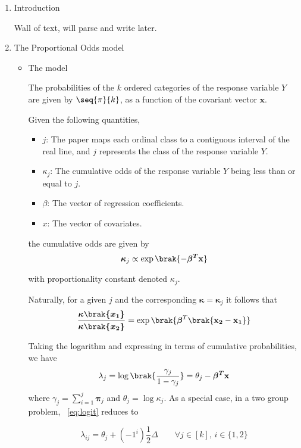 \documentclass{amsart}
\begin{document}
    \begin{enumerate}[label=\textbf{(\Roman*)}]
        \item Introduction

    Wall of text, will parse and write later.

    \item The Proportional Odds model
        \begin{itemize}
            \item The model
            
            The probabilities of the \(k\) ordered categories of the response variable \(Y\) are given by \(\seq{\pi}{k}\), as a function of the covariant vector \(\mathbf{x}\).

        Given the following quantities,
        \begin{itemize}
            \item \(j\): The paper maps each ordinal class to a contiguous interval of the real line, and \(j\) represents the class of the response variable \(Y\).
            \item \(\kappa_j\): The cumulative odds of the response variable \(Y\) being less than or equal to \(j\).
            \item \(\beta\): The vector of regression coefficients.
            \item \(x\): The vector of covariates.
        \end{itemize}

        the cumulative odds are given by
        \[\boldsymbol{\kappa}_j \propto \exp \brak{- \boldsymbol{\beta^T} \mathbf{x}}\]

        with proportionality constant denoted \(\kappa_j\).

        Naturally, for a given \(j\) and the corresponding \(\boldsymbol{\kappa} = \boldsymbol{\kappa}_j\) it follows that 
        \[
            \boldsymbol{\frac{\kappa\brak{x_1}}{\kappa\brak{x_2}}} = \exp \brak{\boldsymbol{\beta}^T \brak{\mathbf{x_2 - x_1}}}
        \]

        Taking the logarithm and expressing in terms of cumulative probabilities, we have
        \[
            \lambda_j = \log\brak{\frac{\gamma_j}{1 - \gamma_j}} = \theta_j - \boldsymbol{\beta^T} \mathbf{x} \label{eq:logit}
        \] where \( \displaystyle \gamma_j = \sum_{i = 1}^{j} \mathbf{\pi}_j\) and \(\theta_j = \log \kappa_j\). 
        As a special case, in a two group problem, ~\ref{eq:logit} reduces to 
        
        \[\lambda_{ij} = \theta_j + (-1^i) \frac{1}{2} \Delta \qquad \forall j \in [k],\, i \in \{1, 2\} \label{eq:delta}\]
    

\end{itemize}
\end{enumerate}
\end{document}
